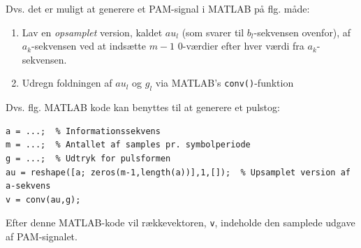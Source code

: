 \documentclass[dvips,11pt,a4paper]{article}
\begin{document}
\noindent{}Dvs. det er muligt at generere et PAM-signal i MATLAB på flg. måde:
\begin{enumerate}
\item Lav en \emph{opsamplet} version, kaldet $au_l$ (som svarer til $b_l$-sekvensen ovenfor), af $a_k$-sekvensen ved at indsætte $m-1$ 0-værdier efter hver værdi fra $a_k$-sekvensen.
\item Udregn foldningen af $au_l$ og $g_l$ via MATLAB's \texttt{conv()}-funktion
\end{enumerate}

\noindent{}Dvs. flg. MATLAB kode kan benyttes til at generere et pulstog:
\begin{verbatim}
a = ...;  % Informationssekvens
m = ...;  % Antallet af samples pr. symbolperiode
g = ...;  % Udtryk for pulsformen
au = reshape([a; zeros(m-1,length(a))],1,[]);  % Upsamplet version af a-sekvens
v = conv(au,g);
\end{verbatim}

\noindent{}Efter denne MATLAB-kode vil rækkevektoren, \texttt{v}, indeholde den samplede udgave af PAM-signalet.
\end{document}
